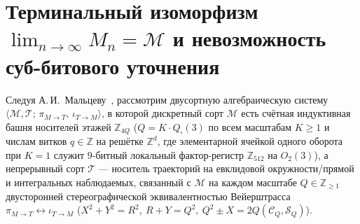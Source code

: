 \documentclass[11pt,a4paper]{article}
\theoremstyle{definition}
\theoremstyle{remark}
\begin{document}
\section{Терминальный изоморфизм $\lim_{n\to\infty} M_n = \mathcal{M}$ и невозможность суб-битового уточнения}
\label{sec:terminal-limit}

Следуя А.\,И.~Мальцеву~\cite{Malcev1970}, рассмотрим двусортную алгебраическую систему $\langle\mathcal{M},\mathcal{T};\,\pi_{M\to T},\,\iota_{T\to M}\rangle$, в которой дискретный сорт $\mathcal{M}$ есть счётная индуктивная башня носителей этажей $\mathbb{Z}_{4Q}$ ($Q = K\cdot Q_\square(3)$ по всем масштабам $K\ge 1$ и числам витков $q\in\mathbb{Z}$ на решётке $\mathbb{Z}^d$, где элементарной ячейкой одного оборота при $K=1$ служит $9$-битный локальный фактор-регистр $\mathbb{Z}_{512}$ на $O_2(3)$), а непрерывный сорт $\mathcal{T}$ --- носитель траекторий на евклидовой окружности/прямой и интегральных наблюдаемых, связанный с $\mathcal{M}$ на каждом масштабе $Q\in\mathbb{Z}_{\ge 1}$ двусторонней стереографической эквивалентностью Вейерштрасса $\pi_{M\to T} \leftrightarrow \iota_{T\to M}$ ($X^2+Y^2=R^2,\ R+Y=Q^2,\ Q^2\pm X = 2Q(\mathcal{C}_Q,\mathcal{S}_Q)$).
\end{document}

